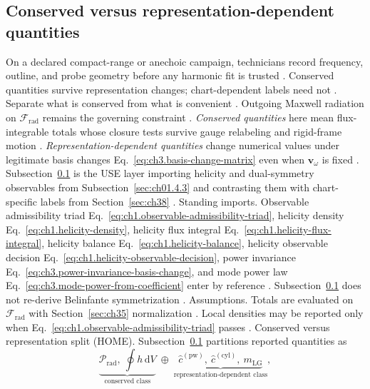 \subsection{Conserved versus representation-dependent quantities}
\label{sec:ch392}
On a declared compact-range or anechoic campaign, technicians record frequency, outline, and probe geometry before any harmonic fit is trusted \cite{hansen1988}. Conserved quantities survive representation changes; chart-dependent labels need not \cite{stratton1941}. Separate what is conserved from what is convenient \cite{jackson1999}. Outgoing Maxwell radiation on $\mathcal{F}_{\mathrm{rad}}$ remains the governing constraint \cite{stratton1941}.
\emph{Conserved quantities} here mean flux-integrable totals whose closure tests survive gauge relabeling and rigid-frame motion
\cite{belinfante1940}. \emph{Representation-dependent quantities} change numerical values under legitimate
basis changes Eq.~\eqref{eq:ch3.basis-change-matrix} even when \(\mathbf{v}_\omega\) is fixed \cite{hansen1988}.
Subsection~\ref{sec:ch392} is the USE layer importing helicity and dual-symmetry observables from Subsection~\ref{sec:ch01.4.3} and
contrasting them with chart-specific labels from Section~\ref{sec:ch38} \cite{belinfante1940}.
Standing imports. Observable admissibility triad Eq.~\eqref{eq:ch1.observable-admissibility-triad}, helicity density
Eq.~\eqref{eq:ch1.helicity-density}, helicity flux integral Eq.~\eqref{eq:ch1.helicity-flux-integral}, helicity balance
Eq.~\eqref{eq:ch1.helicity-balance}, helicity observable decision Eq.~\eqref{eq:ch1.helicity-observable-decision}, power
invariance Eq.~\eqref{eq:ch3.power-invariance-basis-change}, and mode power law Eq.~\eqref{eq:ch3.mode-power-from-coefficient} enter
by reference \cite{belinfante1940}. Subsection~\ref{sec:ch392} does not re-derive Belinfante symmetrization
\cite{belinfante1940}.
Assumptions. Totals are evaluated on \(\mathcal{F}_{\mathrm{rad}}\) with Section~\ref{sec:ch35} normalization \cite{harrington2001}.
Local densities may be reported only when Eq.~\eqref{eq:ch1.observable-admissibility-triad} passes \cite{belinfante1940}.
Conserved versus representation split (HOME). Subsection~\ref{sec:ch392} partitions reported quantities as
\begin{equation}
\label{eq:ch3.conserved-vs-representation-split}
\underbrace{\mathcal{P}_{\mathrm{rad}},\ \oint h\,\mathrm{d}V}_{\text{conserved class}}
\;\oplus\;
\underbrace{\widehat{c}^{(\mathrm{pw})},\ \widehat{c}^{(\mathrm{cyl})},\ m_{\mathrm{LG}}}_{\text{representation-dependent class}},
\end{equation}
